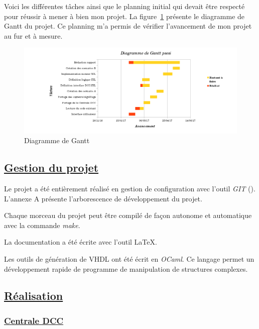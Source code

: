 Voici les différentes t\^aches ainsi que le planning initial qui devait être
respecté pour r\'eussir \`a mener \`a bien mon projet. La
figure~\ref{gantt} pr\'esente le diagramme de Gantt du projet. Ce planning m'a permis de vérifier l'avancement de mon projet au fur et à mesure.

\begin{figure}[h]
\centering
\includegraphics[scale=0.5]{gantt.png}
\caption{Diagramme de Gantt}
\label{gantt}
\end{figure}

\subsection{\underline{Gestion du projet}}
\label{sec:gestion}

Le projet a \'et\'e enti\`erement r\'ealis\'e en gestion de configuration avec l'outil \emph{GIT} (\cite{GIT}). L'annexe A pr\'esente l'arborescence de d\'eveloppement du projet.

Chaque morceau du projet peut \^etre compil\'e de fa\c con autonome et
automatique avec la commande \emph{make}.

La documentation a \'et\'e \'ecrite avec l'outil \LaTeX.

Les outils de g\'en\'eration de VHDL ont \'et\'e \'ecrit en \emph{OCaml}. Ce
langage permet un d\'eveloppement rapide de programme de manipulation de
structures complexes.

\newpage

\subsection{\underline{Réalisation}}
\label{sec:Réal}

\subsubsection{\underline{Centrale DCC}}
\label{sec:Centrale}

